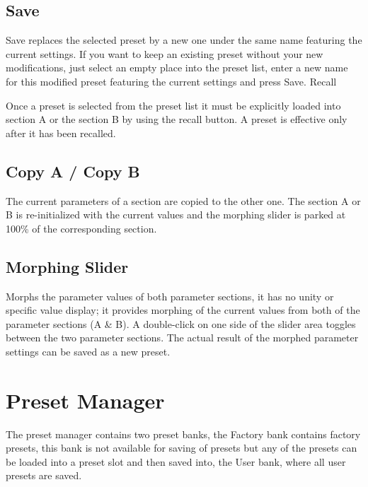 \documentclass[
  letterpaper,
  DIV=11,
  numbers=noendperiod]{scrreport}
\begin{document}
\hypertarget{save}{%
\section{Save}\label{save}}

Save replaces the selected preset by a new one under the same name
featuring the current settings. If you want to keep an existing preset
without your new modifications, just select an empty place into the
preset list, enter a new name for this modified preset featuring the
current settings and press Save. Recall

Once a preset is selected from the preset list it must be explicitly
loaded into section A or the section B by using the recall button. A
preset is effective only after it has been recalled.

\hypertarget{copy-a-copy-b}{%
\section{Copy A / Copy B}\label{copy-a-copy-b}}

The current parameters of a section are copied to the other one. The
section A or B is re-initialized with the current values and the
morphing slider is parked at 100\% of the corresponding section.

\hypertarget{morphing-slider}{%
\section{Morphing Slider}\label{morphing-slider}}

Morphs the parameter values of both parameter sections, it has no unity
or specific value display; it provides morphing of the current values
from both of the parameter sections (A \& B). A double-click on one side
of the slider area toggles between the two parameter sections. The
actual result of the morphed parameter settings can be saved as a new
preset.


\hypertarget{preset-manager}{%
\chapter{Preset Manager}\label{preset-manager}}

The preset manager contains two preset banks, the Factory bank contains
factory presets, this bank is not available for saving of presets but
any of the presets can be loaded into a preset slot and then saved into,
the User bank, where all user presets are saved.
\end{document}
